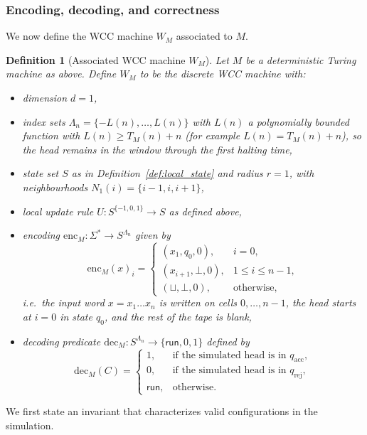 \documentclass[12pt]{article}
\newcommand{\blank}{\sqcup}
\newtheorem{definition}[theorem]{Definition}
\begin{document}
\subsubsection{Encoding, decoding, and correctness}

We now define the WCC machine $W_M$ associated to $M$.

\begin{definition}[Associated WCC machine $W_M$]
\label{def:wm}
Let $M$ be a deterministic Turing machine as above. Define $W_M$ to be the
discrete WCC machine with:
\begin{itemize}
  \item dimension $d = 1$,
  \item index sets $\Lambda_n = \{-L(n),\dots,L(n)\}$ with $L(n)$ a polynomially bounded function with $L(n)\ge T_M(n)+n$
    (for example $L(n)=T_M(n)+n$), so the head remains in the
    window through the first halting time,
  \item state set $S$ as in Definition~\ref{def:local_state} and radius $r = 1$,
    with neighbourhoods $N_1(i) = \{i-1,i,i+1\}$,
  \item local update rule $U : S^{\{-1,0,1\}} \to S$ as defined above,
  \item encoding $\mathrm{enc}_M : \Sigma^* \to S^{\Lambda_n}$ given by
    \[
    \mathrm{enc}_M(x)_i =
    \begin{cases}
      (x_1, q_0, 0), & i = 0,\\[2pt]
      (x_{i+1}, \bot, 0), & 1 \le i \le n-1,\\[2pt]
      (\blank, \bot, 0), & \text{otherwise},
    \end{cases}
    \]
    i.e.~the input word $x = x_1 \dots x_n$ is written on cells $0,\dots,n-1$,
    the head starts at $i=0$ in state $q_0$, and the rest of the tape is blank,
  \item decoding predicate $\mathrm{dec}_M : S^{\Lambda_n} \to \{\mathsf{run},0,1\}$ defined
    by
    \[
    \mathrm{dec}_M(C) =
    \begin{cases}
      1, & \text{if the simulated head is in }q_{\mathrm{acc}},\\
      0, & \text{if the simulated head is in }q_{\mathrm{rej}},\\
      \mathsf{run}, & \text{otherwise}.
    \end{cases}
    \]
\end{itemize}
\end{definition}

We first state an invariant that characterizes valid configurations in the
simulation.
\end{document}
